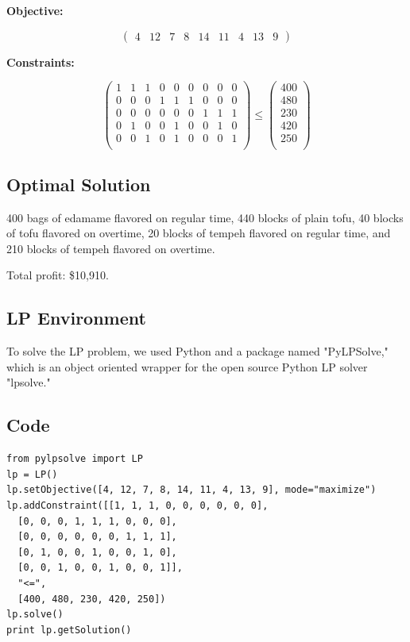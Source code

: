 \documentclass[12pt,letterpaper]{article}
\begin{document}
\textbf{Objective:}

\[ \left( \begin{array}{ccccccccc}
4 & 12 & 7 & 8 & 14 & 11 & 4 & 13 & 9 \end{array} \right)\]

\textbf{Constraints:}

\[ \left( \begin{array}{ccccccccc}
1 & 1 & 1 & 0 & 0 & 0 & 0 & 0 & 0 \\
0 & 0 & 0 & 1 & 1 & 1 & 0 & 0 & 0 \\
0 & 0 & 0 & 0 & 0 & 0 & 1 & 1 & 1 \\
0 & 1 & 0 & 0 & 1 & 0 & 0 & 1 & 0 \\
0 & 0 & 1 & 0 & 1 & 0 & 0 & 0 & 1 \\
\end{array} \right)
\leq
 \left( \begin{array}{c}
400 \\
480 \\
230 \\
420 \\
250 \\
\end{array} \right) \]

\subsection*{Optimal Solution}

400 bags of edamame flavored on regular time, 440 blocks of plain tofu, 40 blocks of tofu flavored on overtime, 20 blocks of tempeh flavored on regular time, and 210 blocks of tempeh flavored on overtime.

Total profit: \$10,910.

\subsection*{LP Environment}

To solve the LP problem, we used Python and a package named "PyLPSolve," which is an object oriented wrapper for the open source Python LP solver "lpsolve."

\subsection*{Code}

\begin{verbatim}
from pylpsolve import LP
lp = LP()
lp.setObjective([4, 12, 7, 8, 14, 11, 4, 13, 9], mode="maximize")
lp.addConstraint([[1, 1, 1, 0, 0, 0, 0, 0, 0],
  [0, 0, 0, 1, 1, 1, 0, 0, 0],
  [0, 0, 0, 0, 0, 0, 1, 1, 1],
  [0, 1, 0, 0, 1, 0, 0, 1, 0],
  [0, 0, 1, 0, 0, 1, 0, 0, 1]],
  "<=",
  [400, 480, 230, 420, 250])
lp.solve()
print lp.getSolution()
\end{verbatim}
\end{document}
